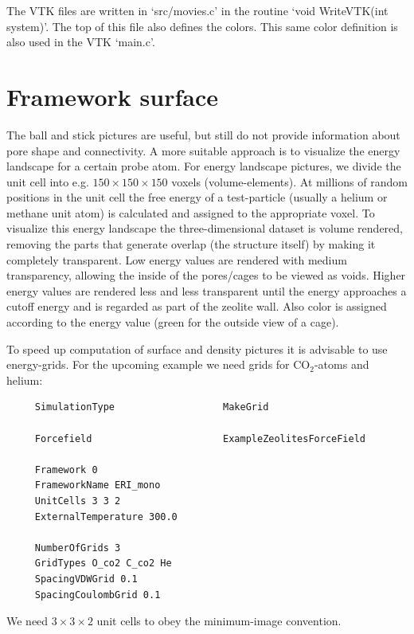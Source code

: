The VTK files are written in `src/movies.c' in the routine `void WriteVTK(int system)'. The top of this file also
defines the colors. This same color definition is also used in the VTK `main.c'.

\section{Framework surface}

The ball and stick pictures are useful, but still do not provide information about pore shape and connectivity.
A more suitable approach is to visualize the energy landscape for a certain probe atom.
For energy landscape pictures, we divide the unit cell
into e.g. $150\times150\times150$ voxels (volume-elements).
At millions of random positions in the unit cell
the free energy of a test-particle (usually a helium or methane unit atom) is calculated
and assigned to the appropriate voxel. To visualize this energy landscape
the three-dimensional dataset is volume rendered,
removing the parts that generate overlap (the structure itself) by making it
completely transparent.
Low energy values are rendered with medium transparency, allowing the inside of the pores/cages to
be viewed as voids. Higher energy values are rendered less and less
transparent until the energy approaches
a cutoff energy and is regarded as part of the zeolite wall. Also color is assigned according
to the energy value (green for the outside view of a cage).

To speed up computation of surface and density pictures it is advisable to use energy-grids. For the upcoming example
we need grids for CO$_2$-atoms and helium:

\begin{verbatim}
     SimulationType                   MakeGrid

     Forcefield                       ExampleZeolitesForceField

     Framework 0
     FrameworkName ERI_mono
     UnitCells 3 3 2
     ExternalTemperature 300.0

     NumberOfGrids 3
     GridTypes O_co2 C_co2 He
     SpacingVDWGrid 0.1
     SpacingCoulombGrid 0.1
\end{verbatim}
We need $3\times3\times2$ unit cells to obey the minimum-image convention.

